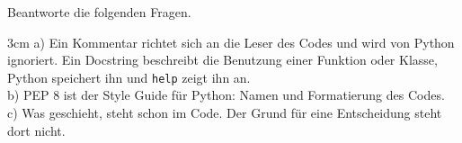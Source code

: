 \question[3]
Beantworte die folgenden Fragen.
\begin{solutionbox}{3cm}
a) Ein Kommentar richtet sich an die Leser des Codes und wird von Python ignoriert. Ein Docstring beschreibt die Benutzung einer
Funktion oder Klasse, Python speichert ihn und \texttt{help} zeigt ihn an. \\
b) PEP 8 ist der Style Guide für Python: Namen und Formatierung des Codes. \\
c) Was geschieht, steht schon im Code. Der Grund für eine Entscheidung steht dort nicht.
\end{solutionbox}
